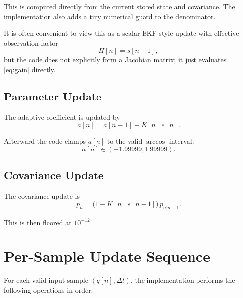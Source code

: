 \documentclass[conference]{IEEEtran}
\begin{document}
    This is computed directly from the current stored state and covariance.
    The implementation also adds a tiny numerical guard to the denominator.

    It is often convenient to view this as a scalar EKF-style update with
    effective observation factor
    \begin{equation}
        H[n] = s[n-1],
    \end{equation}
    but the code does not explicitly form a Jacobian matrix; it just evaluates
    \eqref{eq:gain} directly.

    \subsection{Parameter Update}

    The adaptive coefficient is updated by
    \begin{equation}\label{eq:a_update}
    a[n] = a[n-1] + K[n]\,e[n].
    \end{equation}

    Afterward the code clamps $a[n]$ to the valid $\arccos$ interval:
    \begin{equation}
        a[n] \in (-1.99999,1.99999).
    \end{equation}

    \subsection{Covariance Update}

    The covariance update is
    \begin{equation}\label{eq:p_update}
    p_n = \bigl(1 - K[n]\,s[n-1]\bigr)\,p_{n|n-1}.
    \end{equation}

    This is then floored at $10^{-12}$.

    \section{Per-Sample Update Sequence}\label{sec:update}

    For each valid input sample $(y[n],\Delta t)$, the implementation performs the
    following operations in order.
\end{document}
